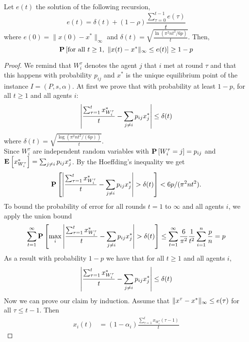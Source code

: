 \begin{lemma}\label{l:recursive_equation}
Let $e(t)$ the solution of the following recursion,
\[e(t) =\delta(t) + (1-\rho)\frac{\sum_{\tau=0}^{t-1}e(\tau)}{t}\]
where $e(0)=\|x(0) - x^*\|_{\infty}$ and \(\delta(t) = \sqrt{\frac{\ln(\pi^2n t^2/6p)}{t}} \). Then,
\[\bm{\mathrm{P}}\left[\text{for all }t \geq 1, ~\| x(t)-x^* \|_{\infty}\leq e(t)\right] \geq 1-p\]
\end{lemma}
\begin{proof}
We remind that $W_i^\tau$ denotes the agent
$j$ that $i$ met at round $\tau$ and that this happens
with probability $p_{ij}$ and $x^*$ is the unique equilibrium point
of the instance $I=(P,s,\alpha)$. At first we prove that
with probability at least $1-p$, for all $t \geq 1$ and all agents $i$:
\begin{equation}\label{eq:error_per_round}
    \left|
    \frac{\sum_{\tau=1}^t x^*_{W_i^\tau}}{t} -
    \sum_{j \neq i} p_{ij} x^*_j
    \right| \leq \delta(t)
\end{equation}
where $\delta(t) = \sqrt{ \frac{\log(\pi^2 n t^2/(6 p))}{t}}$.\\
Since $W_i^\tau$ are independent random variables with
$\bm{\mathrm{P}}\left[W_i^\tau = j\right]=p_{ij}$ and \(\Exp{x^*_{W_i^\tau}} = \sum_{j \neq i} p_{ij} x^*_j\).
By the Hoeffding's inequality we get
  \[
    \bm{\mathrm{P}}\left[
      \left|
      \frac{\sum_{\tau = 1}^{t} x^*_{W_i^\tau}}{t}
      - \sum_{j \neq i} p_{ij} x^*_j \right|
      > \delta(t)
     \right]
    < 6 p / (\pi^2 n t^2).
  \]
To bound the probability of error for all rounds $t=1$ to $\infty$
and all agents $i$, we apply the union bound
  \begin{align*}
    \sum_{t=1}^{\infty}
    \bm{\mathrm{P}}\left[ \max_{i}
      \left|
      \frac{\sum_{\tau = 1}^{t} x^*_{W_i^{\tau}}}{t}
      - \sum_{j \neq i} p_{ij} x^*_j \right|
      > \delta(t)\right]
    \leq
    \sum_{t=1}^{\infty} \frac{6}{\pi^2} \frac{1}{t^2} \sum_{i=1}^n \frac{p}{n} =
    p
  \end{align*}
\noindent As a result with probability $1-p$ we have that for all $t\geq 1$ and all agents $i$,
  \begin{equation}\label{eq:error_per_round}
    \left|
    \frac{\sum_{\tau=1}^t x^*_{W_i^\tau}}{t} -
    \sum_{j \neq i} p_{ij} x^*_j
    \right| \leq \delta(t)
  \end{equation}
\noindent Now we can prove our claim by induction. Assume that $\| x^{\tau}-x^* \|_{\infty} \leq e(\tau)$ for all
$\tau \leq t-1$. Then
\begin{align}
    x_i(t)
    &=
    (1-\alpha_i)\frac{\sum_{\tau=1}^{t}x_{W_i^{\tau}}(\tau-1)}{t}

\end{align}
\end{proof}
